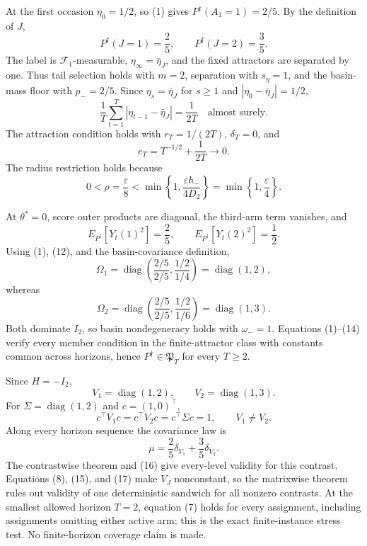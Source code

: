 At the first occasion \(\eta_0=1/2\), so (1) gives \(P^\dagger(A_1=1)=2/5\).  By the definition of \(J\),
\[
 P^\dagger(J=1)=\frac25,
 \qquad P^\dagger(J=2)=\frac35.
\tag{8}
\]
The label is \(\mathcal F_1\)-measurable, \(\eta_\infty=\bar\eta_J\), and the fixed attractors are separated by one.  Thus tail selection holds with \(m=2\), separation with \(s_\eta=1\), and the basin-mass floor with \(p_-=2/5\).  Since \(\eta_s=\bar\eta_J\) for \(s\ge1\) and \(|\eta_0-\bar\eta_J|=1/2\),
\[
 \frac1T\sum_{t=1}^T|\eta_{t-1}-\bar\eta_J|=\frac1{2T}
 \quad\text{almost surely}.
\tag{9}
\]
The attraction condition holds with \(r_T=1/(2T)\), \(\delta_T=0\), and
\[
 e_T=T^{-1/2}+\frac1{2T}\longrightarrow0.
\tag{10}
\]
The radius restriction holds because
\[
 0<\rho=\frac\varepsilon8
 <\min\left\{1,\frac{\varepsilon h_-}{4D_2}\right\}
 =\min\left\{1,\frac\varepsilon4\right\}.
\tag{11}
\]

At \(\theta^*=0\), score outer products are diagonal, the third-arm term vanishes, and
\[
 E_{P^\dagger}[Y_t(1)^2]=\frac25,
 \qquad E_{P^\dagger}[Y_t(2)^2]=\frac12.
\tag{12}
\]
Using (1), (12), and the basin-covariance definition,
\[
 \Omega_1=\operatorname{diag}\left(\frac{2/5}{2/5},
 \frac{1/2}{1/4}\right)=\operatorname{diag}(1,2),
\tag{13}
\]
whereas
\[
 \Omega_2=\operatorname{diag}\left(\frac{2/5}{2/5},
 \frac{1/2}{1/6}\right)=\operatorname{diag}(1,3).
\tag{14}
\]
Both dominate \(I_2\), so basin nondegeneracy holds with \(\omega_-=1\).  Equations (1)--(14) verify every member condition in the finite-attractor class with constants common across horizons, hence \(P^\dagger\in\mathfrak P_T\) for every \(T\ge2\).

Since \(H=-I_2\),
\[
 V_1=\operatorname{diag}(1,2),
 \qquad V_2=\operatorname{diag}(1,3).
\tag{15}
\]
For \(\Sigma=\operatorname{diag}(1,2)\) and \(c=(1,0)^\top\),
\[
 c^\top V_1c=c^\top V_2c=c^\top\Sigma c=1,
 \qquad V_1\ne V_2.
\tag{16}
\]
Along every horizon sequence the covariance law is
\[
 \mu=\frac25\delta_{V_1}+\frac35\delta_{V_2}.
\tag{17}
\]
The contrastwise theorem and (16) give every-level validity for this contrast.  Equations (8), (15), and (17) make \(V_J\) nonconstant, so the matrixwise theorem rules out validity of one deterministic sandwich for all nonzero contrasts.  At the smallest allowed horizon \(T=2\), equation (7) holds for every assignment, including assignments omitting either active arm; this is the exact finite-instance stress test.  No finite-horizon coverage claim is made.
